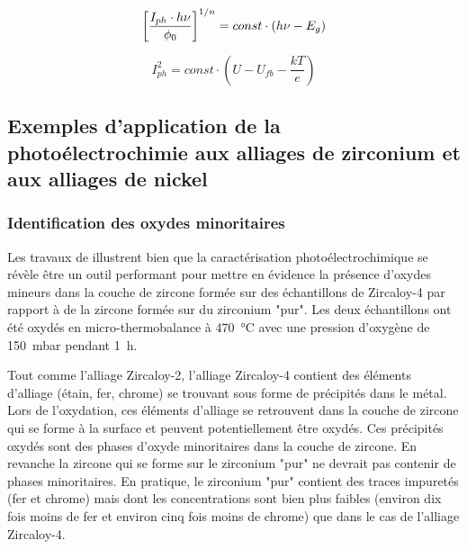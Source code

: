 \begin{refsection}
    \begin{equation}
        \left[ \frac{I_{ph} \cdot h\nu}{\phi _0} \right] ^{1/n} = const \cdot (h\nu - E_g)
        \label{eq:iph_linear_transform}
    \end{equation}

     \begin{equation}
        I_{ph}^2 = const \cdot (U-U_{fb}-\frac{kT}{e})
        \label{eq:iph_linear_transform_potential}
    \end{equation}

    
    \subsection[Exemples d'application de la photoélectrochimie]
    {Exemples d'application de la photoélectrochimie aux alliages de zirconium et aux alliages de
    nickel}\label{subsec:ch1_PEC_applications}

    \subsubsection{Identification des oxydes minoritaires}
     
    Les travaux de \citet{Benaboud2007} illustrent bien que la caractérisation photoélectrochimique se révèle être un outil
    performant pour mettre en évidence la présence d'oxydes
    mineurs dans la couche de zircone formée sur des échantillons de Zircaloy-4 par rapport à de la zircone formée sur du
    zirconium "pur". Les deux échantillons ont été oxydés en micro-thermobalance à \SI{470}{\degreeCelsius} avec une pression d'oxygène de
    \SI{150}{\milli\bar} pendant 1~h.
    
    Tout comme l'alliage Zircaloy-2, l'alliage Zircaloy-4 contient des éléments d'alliage (étain, fer, chrome) 
    se trouvant sous forme de précipités
    dans le métal. Lors de l'oxydation, ces éléments d'alliage se retrouvent dans la couche de zircone qui se forme à la
    surface et peuvent potentiellement être oxydés.
    Ces précipités oxydés sont des phases d'oxyde minoritaires dans la couche de zircone.
    En revanche la zircone qui se forme sur le zirconium "pur" ne devrait pas contenir de phases minoritaires. 
    En pratique, le zirconium "pur" contient des traces impuretés (fer et chrome) mais dont les concentrations sont bien
    plus faibles
    (environ dix fois moins de fer et environ cinq fois moins de chrome) que dans le cas de l'alliage Zircaloy-4.
    

\end{refsection}
